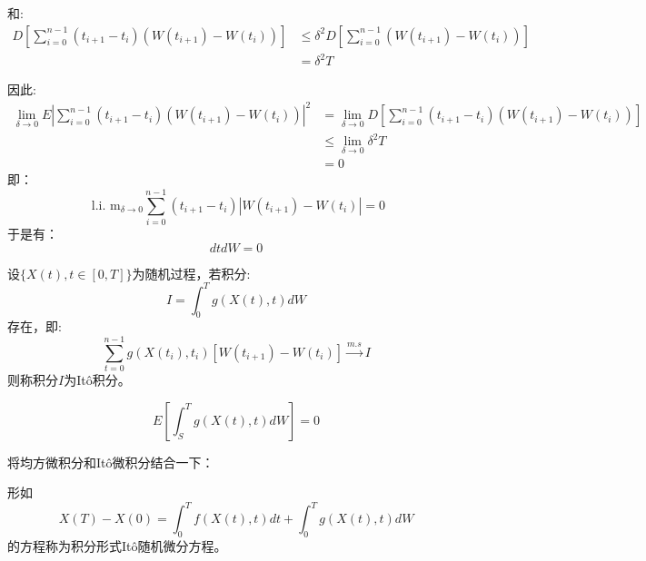 \documentclass[lang=cn,newtx,10pt,scheme=chinese]{elegantbook}
\begin{document}
和:
$$
\begin{aligned}
D\left[\sum_{i=0}^{n-1}\left(t_{i+1}-t_i\right)\left(W\left(t_{i+1}\right)-W\left(t_i\right)\right)\right] & \leq \delta^2 D\left[\sum_{i=0}^{n-1}\left(W\left(t_{i+1}\right)-W\left(t_i\right)\right)\right] \\
& =\delta^2 T
\end{aligned}
$$

因此:
$$
\begin{aligned}
\lim _{\delta \rightarrow 0} E\left|\sum_{i=0}^{n-1}\left(t_{i+1}-t_i\right)\left(W\left(t_{i+1}\right)-W\left(t_i\right)\right)\right|^2 & =\lim _{\delta \rightarrow 0} D\left[\sum_{i=0}^{n-1}\left(t_{i+1}-t_i\right)\left(W\left(t_{i+1}\right)-W\left(t_i\right)\right)\right] \\
& \leq \lim _{\delta \rightarrow 0} \delta^2 T \\
& =0
\end{aligned}
$$
即：
$$
\text { l.i. } \mathrm{m}_{\delta \rightarrow 0} \sum_{i=0}^{n-1}\left(t_{i+1}-t_i\right)\left|W\left(t_{i+1}\right)-W\left(t_i\right)\right|=0
$$
于是有：
\begin{equation}
  dt dW = 0
\end{equation}

\begin{definition}[Itô积分]
  设$\{X(t), t\in [0, T] \}$为随机过程，若积分:
  \begin{equation}
    I=\int_0^T g(X(t), t) d W
  \end{equation}
  存在，即:
$$
\sum_{t=0}^{n-1} g\left(X\left(t_i\right), t_i\right)\left[W\left(t_{i+1}\right)-W\left(t_i\right)\right] \xrightarrow{m . s} I
$$
则称积分$I$为Itô积分。
\end{definition}

\begin{property}
  \begin{equation}
    E\left[\int_S^T g(X(t), t) d W\right]=0
    \end{equation}
\end{property}

将均方微积分和Itô微积分结合一下：
\begin{definition}[Itô随机微分方程]
  形如
  \begin{equation}
    X(T)-X(0)=\int_0^T f(X(t), t) d t+\int_0^T g(X(t), t) d W
  \end{equation}
  的方程称为积分形式Itô随机微分方程。
\end{definition}
\end{document}

